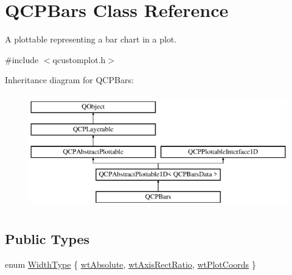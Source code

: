 \hypertarget{class_q_c_p_bars}{}\section{Q\+C\+P\+Bars Class Reference}
\label{class_q_c_p_bars}


A plottable representing a bar chart in a plot.  




{\ttfamily \#include $<$qcustomplot.\+h$>$}

Inheritance diagram for Q\+C\+P\+Bars\+:\begin{figure}[H]
\begin{center}
\leavevmode
\includegraphics[height=5.000000cm]{d9/d56/class_q_c_p_bars}
\end{center}
\end{figure}
\subsection*{Public Types}
\begin{DoxyCompactItemize}
\item 
enum \mbox{\hyperlink{class_q_c_p_bars_a65dbbf1ab41cbe993d71521096ed4649}{Width\+Type}} \{ \mbox{\hyperlink{class_q_c_p_bars_a65dbbf1ab41cbe993d71521096ed4649ab74315c9aa77df593c58dd25dfc0de35}{wt\+Absolute}}, 
\mbox{\hyperlink{class_q_c_p_bars_a65dbbf1ab41cbe993d71521096ed4649a90bc09899361ad3422ff277f7c790ffe}{wt\+Axis\+Rect\+Ratio}}, 
\mbox{\hyperlink{class_q_c_p_bars_a65dbbf1ab41cbe993d71521096ed4649aad3cc60ae1bfb1160a30237bee9eaf10}{wt\+Plot\+Coords}}
 \}
\end{DoxyCompactItemize}
